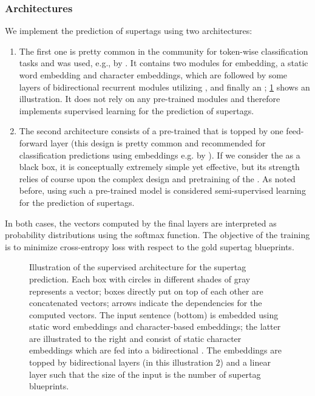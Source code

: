\documentclass[../document.tex]{subfiles}
\begin{document}
    \subsubsection{Architectures}
    We implement the prediction of supertags using two architectures:
    \begin{enumerate}
        \item
            The first one is pretty common in the  community for token-wise classification tasks and was used, e.g., by \citet{vaswani2016supertagging,StaSte20,Cor20}.
            It contains two modules for embedding, a static word embedding and character embeddings, which are followed by some layers of bidirectional recurrent modules utilizing , and finally an ; \cref{fig:architecture:supervised} shows an illustration.
            It does not rely on any pre-trained modules and therefore implements supervised learning for the prediction of supertags.
        \item
            The second architecture consists of a pre-trained  that is topped by one feed-forward layer (this design is pretty common and recommended for classification predictions using  embeddings e.g. by \citet{Devlin2019}).
            If we consider the  as a black box, it is conceptually extremely simple yet effective, but its strength relies of course upon the complex design and pretraining of the .
            As noted before, using such a pre-trained model is considered semi-supervised learning for the prediction of supertags.
    \end{enumerate}
    In both cases, the vectors computed by the final layers are interpreted as probability distributions using the softmax function.
    The objective of the training is to minimize cross-entropy loss with respect to the gold supertag blueprints.

    \begin{figure}
        \centering
        
        \caption{\label{fig:architecture:supervised}
            Illustration of the supervised  architecture for the supertag prediction.
            Each box with circles in different shades of gray represents a vector; boxes directly put on top of each other are concatenated vectors; arrows indicate the dependencies for the computed vectors.
            The input sentence (bottom) is embedded using static word embeddings and character-based embeddings; the latter are illustrated to the right and consist of static character embeddings which are fed into a bidirectional .
            The embeddings are topped by bidirectional  layers (in this illustration 2) and a linear layer such that the size of the input is the number of supertag blueprints.
        }
    \end{figure}


    \ifSubfilesClassLoaded{%
        \printindex
    }{}
\end{document}
